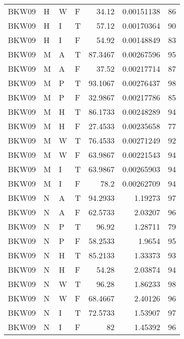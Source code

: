 \begin{table}[!htb]
{\begin{tabular}{llllrrr}
            BKW09    & H     & W     & F          & 34.12      & 0.00151138  & 86       \\
            BKW09    & H     & I     & T          & 57.12      & 0.00170364  & 90       \\
            BKW09    & H     & I     & F          & 54.92      & 0.00148849  & 83       \\
            BKW09    & M     & A     & T          & 87.3467    & 0.00267596  & 95       \\
            BKW09    & M     & A     & F          & 37.52      & 0.00217714  & 87       \\
            BKW09    & M     & P     & T          & 93.1067    & 0.00276437  & 98       \\
            BKW09    & M     & P     & F          & 32.9867    & 0.00217786  & 85       \\
            BKW09    & M     & H     & T          & 86.1733    & 0.00248289  & 94       \\
            BKW09    & M     & H     & F          & 27.4533    & 0.00235658  & 77       \\
            BKW09    & M     & W     & T          & 76.4533    & 0.00271249  & 92       \\
            BKW09    & M     & W     & F          & 63.9867    & 0.00221543  & 94       \\
            BKW09    & M     & I     & T          & 63.9867    & 0.00265903  & 94       \\
            BKW09    & M     & I     & F          & 78.2       & 0.00262709  & 94       \\
            BKW09    & N     & A     & T          & 94.2933    & 1.19273     & 97       \\
            BKW09    & N     & A     & F          & 62.5733    & 2.03207     & 96       \\
            BKW09    & N     & P     & T          & 96.92      & 1.28711     & 79       \\
            BKW09    & N     & P     & F          & 58.2533    & 1.9654      & 95       \\
            BKW09    & N     & H     & T          & 85.2133    & 1.33373     & 93       \\
            BKW09    & N     & H     & F          & 54.28      & 2.03874     & 94       \\
            BKW09    & N     & W     & T          & 96.28      & 1.86233     & 98       \\
            BKW09    & N     & W     & F          & 68.4667    & 2.40126     & 96       \\
            BKW09    & N     & I     & T          & 72.5733    & 1.53907     & 97       \\
            BKW09    & N     & I     & F          & 82         & 1.45392     & 96       \\
            \hline
        \end{tabular}
    }{}
\end{table}
